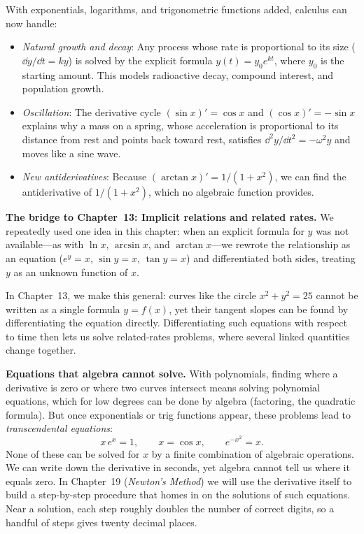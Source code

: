 \begin{connectionbox}
With exponentials, logarithms, and trigonometric functions added, calculus can now handle:
\begin{itemize}
  \item \emph{Natural growth and decay}: Any process whose rate is proportional to its size ($\dd y/\dd t = ky$) is solved by the explicit formula $y(t) = y_0 e^{kt}$, where $y_0$ is the starting amount. This models radioactive decay, compound interest, and population growth.
  \item \emph{Oscillation}: The derivative cycle $(\sin x)' = \cos x$ and $(\cos x)' = -\sin x$ explains why a mass on a spring, whose acceleration is proportional to its distance from rest and points back toward rest, satisfies $\dd^2 y/\dd t^2 = -\omega^2 y$ and moves like a sine wave.
  \item \emph{New antiderivatives}: Because $(\arctan x)' = 1/(1+x^2)$, we can find the antiderivative of $1/(1+x^2)$, which no algebraic function provides.
\end{itemize}

\textbf{The bridge to Chapter~13: Implicit relations and related rates.}
We repeatedly used one idea in this chapter: when an explicit formula for $y$
was not available---as with $\ln x$, $\arcsin x$, and $\arctan x$---we rewrote the
relationship as an equation ($e^y = x$, $\sin y = x$, $\tan y = x$) and differentiated
both sides, treating $y$ as an unknown function of $x$.

In Chapter~13, we make this general: curves like the circle $x^2 + y^2 = 25$ cannot be
written as a single formula $y = f(x)$, yet their tangent slopes can be found by differentiating the
equation directly. Differentiating such equations with respect to time then lets us solve
related-rates problems, where several linked quantities change together.

\textbf{Equations that algebra cannot solve.}
With polynomials, finding where a derivative is zero or where two
curves intersect means solving polynomial equations, which for low degrees
can be done by algebra (factoring, the quadratic formula). But once exponentials or trig
functions appear, these problems lead to \emph{transcendental equations}:
\[
  x\,e^x = 1, \qquad x = \cos x, \qquad e^{-x^2} = x.
\]
None of these can be solved for $x$ by a finite combination of
algebraic operations. We can write down the derivative in
seconds, yet algebra cannot tell us where it equals zero.
In Chapter~19 (\emph{Newton's Method}) we will use the derivative itself to
build a step-by-step procedure that homes in on the solutions of such equations.
Near a solution, each step roughly doubles the number of correct digits, so a
handful of steps gives twenty decimal places.
\end{connectionbox}

